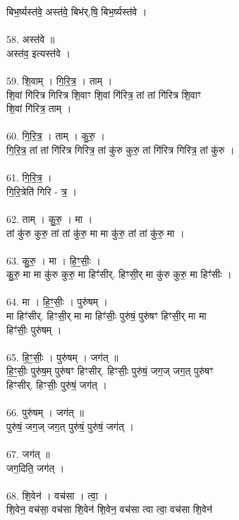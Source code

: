 बिभ॒र्ष्यस्त॑वे॒ अस्त॑वे॒ बिभ॑र्.षि॒ बिभ॒र्ष्यस्त॑वे ।\\
\\
58. अस्त॑वे ॥\\
अस्त॑व॒ इत्यस्त॑वे ।\\
\\
59. शि॒वाम् । गि॒रि॒त्र॒ । ताम् ।\\
शि॒वां गि॑रित्र गिरित्र शि॒वाꣳ शि॒वां गि॑रित्र॒ तां तां गि॑रित्र शि॒वाꣳ\\
शि॒वां गि॑रित्र॒ ताम् ।\\
\\
60. गि॒रि॒त्र॒ । ताम् । कु॒रु॒ ।\\
गि॒रि॒त्र॒ तां तां गि॑रित्र गिरित्र॒ तां कु॑रु कुरु॒ तां गि॑रित्र गिरित्र॒ तां कु॑रु ।\\
\\
61. गि॒रि॒त्र॒ ।\\
गि॒रि॒त्रेति॑ गिरि - त्र॒ ।\\
\\
62. ताम् । कु॒रु॒ । मा ।\\
तां कु॑रु कुरु॒ तां तां कु॑रु॒ मा मा कु॑रु॒ तां तां कु॑रु॒ मा ।\\
\\
63. कु॒रु॒ । मा । हि॒ꣳ॒सीः॒ ।\\
कु॒रु॒ मा मा कु॑रु कुरु॒ मा हिꣳ॑सीर्. हिꣳसी॒र् मा कु॑रु कुरु॒ मा हिꣳ॑सीः ।\\
\\
64. मा । हि॒ꣳ॒सीः॒ । पुरु॑षम् ।\\
मा हिꣳ॑सीर्. हिꣳसी॒र् मा मा हिꣳ॑सीः॒ पुरु॑षं॒ पुरु॑षꣳ हिꣳसी॒र् मा मा\\
हिꣳ॑सीः॒ पुरु॑षम् ।\\
\\
65. हि॒ꣳ॒सीः॒ । पुरु॑षम् । जग॑त् ॥\\
हि॒ꣳ॒सीः॒ पुरु॑ष॒म् पुरु॑षꣳ हिꣳसीर्. हिꣳसीः॒ पुरु॑षं॒ जग॒ज् जग॒त् पुरु॑षꣳ\\
हिꣳसीर्. हिꣳसीः॒ पुरु॑षं॒ जग॑त् ।\\
\\
66. पुरु॑षम् । जग॑त् ॥\\
पुरु॑षं॒ जग॒ज् जग॒त् पुरु॑षं॒ पुरु॑षं॒ जग॑त् ।\\
\\
67. जग॑त् ॥\\
जग॒दिति॒ जग॑त् ।\\
\\
68. शि॒वेन॑ । वच॑सा । त्वा॒ ।\\
शि॒वेन॒ वच॑सा॒ वच॑सा शि॒वेन॑ शि॒वेन॒ वच॑सा त्वा त्वा॒ वच॑सा शि॒वेन॑\\
